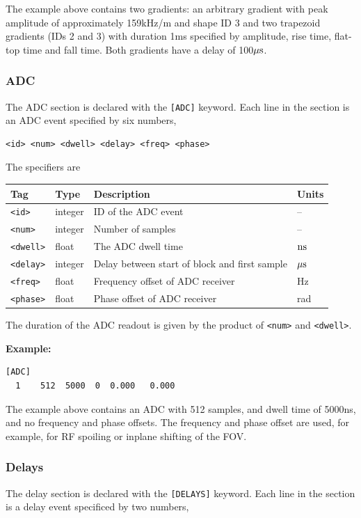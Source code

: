 \documentclass{article}
\begin{document}
The example above contains two gradients: an arbitrary gradient with peak amplitude of approximately 159kHz/m and shape ID 3 and two trapezoid gradients (IDs 2 and 3) with duration 1ms specified by amplitude, rise time, flat-top time and fall time.
Both gradients have a delay of 100$\rm \mu s$.

\subsubsection{ADC}
The ADC section is declared with the \verb.[ADC]. keyword. Each line in the section is an ADC event specified by six numbers,
\begin{lstlisting}
<id> <num> <dwell> <delay> <freq> <phase>
\end{lstlisting}

The specifiers are

\begin{tabularx}{\textwidth}{llXl}
\toprule
Tag & Type & Description & Units\\
\midrule
\verb.<id>. & integer & ID of the ADC event & -- \\
\verb.<num>. & integer & Number of samples & -- \\
\verb.<dwell>. & float & The ADC dwell time & $\rm n s$ \\
\verb.<delay>. & integer & Delay between start of block and first sample & $\rm \mu s$  \\
\verb.<freq>. & float & Frequency offset of ADC receiver & Hz \\
\verb.<phase>. & float & Phase offset of ADC receiver & rad \\
\bottomrule
\end{tabularx}

The duration of the ADC readout is given by the product of \verb.<num>. and \verb.<dwell>..

\begin{minipage}{\textwidth}
\textbf{Example:}
\begin{lstlisting}
[ADC]
  1    512  5000  0  0.000   0.000
\end{lstlisting}
\end{minipage}

The example above contains an ADC with 512 samples, and dwell time of 5000ns, and no frequency and phase offsets. The frequency and phase offset are used, for example, for RF spoiling or inplane shifting of the FOV.

\subsubsection{Delays}
The delay section is declared with the \verb.[DELAYS]. keyword. Each line in the section is a delay event specificed by two numbers,
\end{document}
